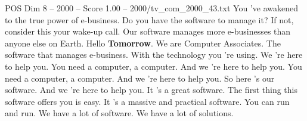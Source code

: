 \begin{textsample}{POS Dim 8 – 2000 – Score 1.00 – 2000/tv\_com\_2000\_43.txt}  \label{ex:f8_pos_039}
You 've awakened to the true power of e-business.
Do you have the software to manage it?
If not, consider this your wake-up call.
Our software manages more e-businesses than anyone else on Earth.
Hello \textbf{Tomorrow}.
We are Computer Associates.
The software that manages e-business.
With the technology you 're using.
We 're here to help you.
You need a computer, a computer.
And we 're here to help you.
You need a computer, a computer.
And we 're here to help you.
So here 's our software.
And we 're here to help you.
It 's a great software.
The first thing this software offers you is easy.
It 's a massive and practical software.
You can run and run.
We have a lot of software.
We have a lot of solutions.

\end{textsample}
